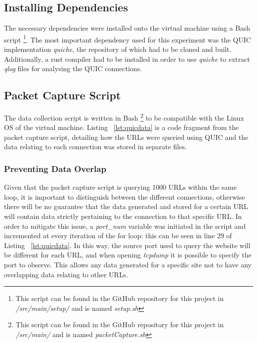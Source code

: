 \documentclass{l4proj}
\begin{document}
\subsection{Installing Dependencies}

The necessary dependencies were installed onto the virtual machine using a Bash script \footnote{This script can be found in the GitHub repository for this project in \emph{/src/main/setup/} and is named \emph{setup.sh}}. The most important dependency used for this experiment was the QUIC implementation \emph{quiche}, the repository of which had to be cloned and built. Additionally, a rust compiler had to be installed in order to use \emph{quiche} to extract \emph{qlog} files for analysing the QUIC connections. 

\subsection{Packet Capture Script}

The data collection script is written in Bash \footnote{This script can be found in the GitHub repository for this project in \emph{/src/main/} and is named \emph{packetCapture.sh}} to be compatible with the Linux OS of the virtual machine. Listing ~\ref{lst:quicdata} is a code fragment from the packet capture script, detailing how the URLs were queried using QUIC and the data relating to each connection was stored in separate files.

\subsubsection{Preventing Data Overlap} Given that the packet capture script is querying 1000 URLs within the same loop, it is important to distinguish between the different connections, otherwise there will be no guarantee that the data generated and stored for a certain URL will contain data strictly pertaining to the connection to that specific URL. In order to mitigate this issue, a \emph{port\_num} variable was initiated in the script and incremented at every iteration of the for loop: this can be seen in line 29 of Listing ~\ref{lst:quicdata}. In this way, the source port used to query the website will be different for each URL, and when opening \emph{tcpdump} it is possible to specify the port to observe. This allows any data generated for a specific site not to have any overlapping data relating to other URLs.
\end{document}
